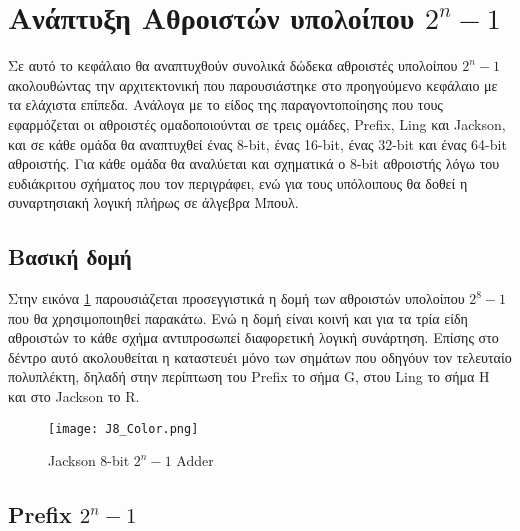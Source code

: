 \section{Ανάπτυξη Αθροιστών υπολοίπου $2^n-1$ }

Σε αυτό το κεφάλαιο θα αναπτυχθούν συνολικά δώδεκα αθροιστές υπολοίπου $2^n-1$
ακολουθώντας την αρχιτεκτονική που παρουσιάστηκε στο προηγούμενο κεφάλαιο 
με τα ελάχιστα επίπεδα. Ανάλογα με το είδος της παραγοντοποίησης που τους εφαρμόζεται 
οι αθροιστές ομαδοποιούνται σε τρεις ομάδες, Prefix, Ling και Jackson,
και σε κάθε ομάδα θα αναπτυχθεί ένας 8-bit, ένας 16-bit, ένας 32-bit και ένας 64-bit 
αθροιστής. Για κάθε ομάδα θα αναλύεται και σχηματικά ο 8-bit αθροιστής λόγω του 
ευδιάκριτου σχήματος που τον περιγράφει, ενώ για τους υπόλοιπους θα δοθεί η
συναρτησιακή λογική πλήρως σε άλγεβρα Μπουλ.




\subsection{Βασική δομή}
Στην εικόνα \ref{2^8-1_Tree_2x4} παρουσιάζεται προσεγγιστικά η δομή των αθροιστών υπολοίπου $2^8-1$ 
που θα χρησιμοποιηθεί παρακάτω. Ενώ η δομή είναι κοινή και για τα τρία είδη αθροιστών το κάθε σχήμα 
αντιπροσωπεί διαφορετική λογική συνάρτηση. Επίσης στο δέντρο αυτό ακολουθείται η καταστευέι μόνο 
των σημάτων που οδηγόυν τον τελευταίο πολυπλέκτη, δηλαδή στην περίπτωση του Prefix το σήμα G, στου Ling
το σήμα H και στο Jackson το R.
\begin{figure}[H]
\centering
\texttt{[image: J8\_Color.png]}
\caption{Jackson 8-bit $2^n-1$ Adder}
\label{2^8-1_Tree_2x4}
\end{figure}







\subsection{Prefix $2^n-1$}


